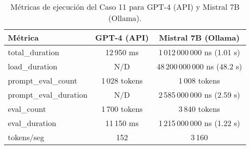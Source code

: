 
\begin{table}[h!]
\centering
\begin{tabular}{|l|c|c|}
\hline
\textbf{Métrica} & \textbf{GPT-4 (API)} & \textbf{Mistral 7B (Ollama)} \\
\hline
total\_duration & 12\,950 ms & 1\,012\,000\,000 ns (1.01 s) \\
load\_duration & N/D & 48\,200\,000\,000 ns (48.2 s) \\
prompt\_eval\_count & 1\,028 tokens & 1\,008 tokens \\
prompt\_eval\_duration & N/D & 2\,585\,000\,000 ns (2.59 s) \\
eval\_count & 1\,700 tokens & 3\,840 tokens \\
eval\_duration & 11\,150 ms & 1\,215\,000\,000 ns (1.22 s) \\
tokens/seg & 152 & 3\,160 \\
\hline
\end{tabular}
\caption{Métricas de ejecución del Caso 11 para GPT-4 (API) y Mistral 7B (Ollama).}
\end{table}
